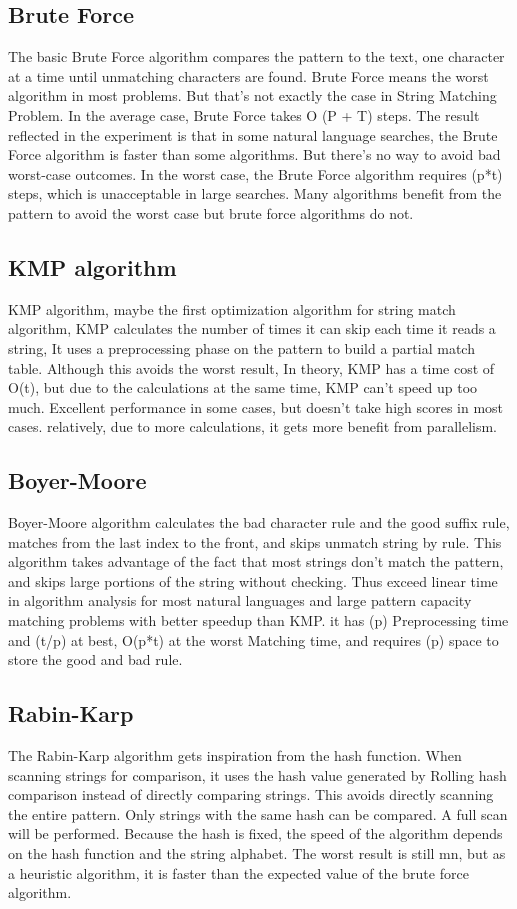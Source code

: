 \documentclass[11pt]{article}       %
\begin{document}
\subsection{Brute Force}\label{bf}
The basic Brute Force algorithm compares the pattern to the text, one character at a time until unmatching characters are found. Brute Force means the worst algorithm in most problems. But that's not exactly the case in String Matching Problem. In the average case, Brute Force takes O (P + T) steps. The result reflected in the experiment is that in some natural language searches, the Brute Force algorithm is faster than some algorithms. But there's no way to avoid bad worst-case outcomes. In the worst case, the Brute Force algorithm requires (p*t) steps, which is unacceptable in large searches. Many algorithms benefit from the pattern to avoid the worst case but brute force algorithms do not.

\subsection{KMP algorithm}\label{kmp}
KMP algorithm, maybe the first optimization algorithm\cite{KMP} for string match algorithm, KMP calculates the number of times it can skip each time it reads a string, It uses a preprocessing phase on the pattern to build a partial match table. Although this avoids the worst result, In theory, KMP has a time cost of O(t), but due to the calculations at the same time, KMP can’t speed up too much. Excellent performance in some cases, but doesn’t take high scores in most cases. relatively, due to more calculations, it gets more benefit from parallelism.

\subsection{Boyer-Moore}\label{bm}
Boyer-Moore algorithm calculates the bad character rule and the good suffix rule\cite{BM}, matches from the last index to the front, and skips unmatch string by rule. This algorithm takes advantage of the fact that most strings don’t match the pattern, and skips large portions of the string without checking. Thus exceed linear time in algorithm analysis for most natural languages and large pattern capacity matching problems with better speedup than KMP. it has (p) Preprocessing time and  (t/p) at best, O(p*t) at the worst Matching time, and requires (p) space to store the good and bad rule.


\subsection{Rabin-Karp}\label{rk}
The Rabin-Karp algorithm gets inspiration from the hash function. When scanning strings for comparison, it uses the hash value generated by Rolling hash comparison instead of directly comparing strings\cite{KR}. This avoids directly scanning the entire pattern. Only strings with the same hash can be compared. A full scan will be performed. Because the hash is fixed, the speed of the algorithm depends on the hash function and the string alphabet. The worst result is still mn, but as a heuristic algorithm, it is faster than the expected value of the brute force algorithm.
\end{document}
